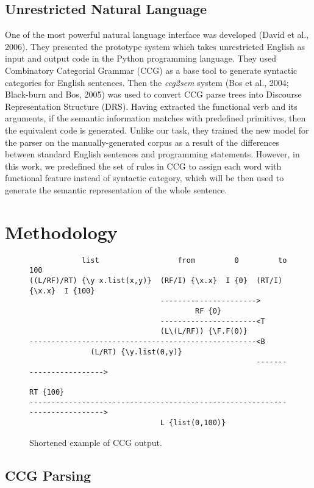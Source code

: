 \documentclass[11pt,letterpaper]{article}
\begin{document}
\subsection{Unrestricted Natural Language}
One of the most powerful natural language interface was developed (David et al., 2006). They presented the prototype system which takes unrestricted English as input and output code in the Python programming language. They used Combinatory Categorial Grammar (CCG) as a base tool to generate syntactic categories for English sentences. Then the \textit{ccg2sem} system (Bos et al., 2004; Black-burn and Bos, 2005) was used to convert CCG parse trees into Discourse Representation Structure (DRS). Having extracted the functional verb and its arguments, if the semantic information matches with predefined primitives, then the equivalent code is generated. Unlike our task, they trained the new model for the parser on the manually-generated corpus as a result of the differences between standard English sentences and programming statements. However, in this work, we predefined the set of rules in CCG to assign each word with functional feature instead of syntactic category, which will be then used to generate the semantic representation of the whole sentence.

\section{Methodology}

\begin{figure*}[t]
  \small
  \begin{verbatim}
            list                  from         0         to          100
((L/RF)/RT) {\y x.list(x,y)}  (RF/I) {\x.x}  I {0}  (RT/I) {\x.x}  I {100}
                              ---------------------->
                                      RF {0}
                              ----------------------<T
                              (L\(L/RF)) {\F.F(0)}
----------------------------------------------------<B
              (L/RT) {\y.list(0,y)}
                                                    ------------------------>
                                                            RT {100}
---------------------------------------------------------------------------->
                              L {list(0,100)}
  \end{verbatim}
  \caption{\label{font-figure} Shortened example of CCG output.}
\end{figure*}

\subsection{CCG Parsing}
\end{document}
